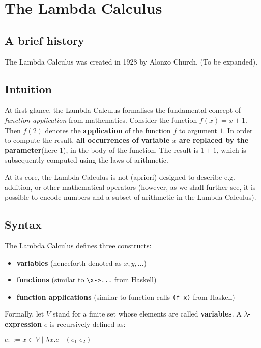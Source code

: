 \section*{ The Lambda Calculus }

\subsection*{ A brief history }

The Lambda Calculus was created in 1928 by Alonzo Church. (To be expanded).

\subsection*{ Intuition }

At first glance, the Lambda Calculus formalises the fundamental concept of \textit{function application} from mathematics. Consider the function $f(x) = x + 1$. Then $f(2)$ denotes the \textbf{application} of the function $f$ to argument $1$. In order to compute the result, \textbf{all occurrences of variable $x$ are replaced by the parameter}(here $1$), in the body of the function. The result is $1+1$, which is subsequently computed using the laws of arithmetic.

At its core, the Lambda Calculus is not (apriori) designed to describe e.g. addition, or other mathematical operators (however, as we shall further see, it is possible to encode numbers and a subset of arithmetic in the Lambda Calculus).

\subsection*{ Syntax }

The Lambda Calculus defines three constructs:
\begin{itemize}
	\item  \textbf{variables} (henceforth denoted as $x, y, \ldots$)
	\item  \textbf{functions} (similar to \texttt{\textbackslash x-\textgreater ...} from Haskell)
	\item  \textbf{function applications} (similar to function calls \texttt{(f x)} from Haskell)
\end{itemize}

Formally, let $V$ stand for a finite set whose elements are called \textbf{variables}. A \textbf{$\lambda$-expression} $e$ is recursively defined as:

$e ::= x \in V \mid \lambda x.e \mid (e_1\;e_2)$

